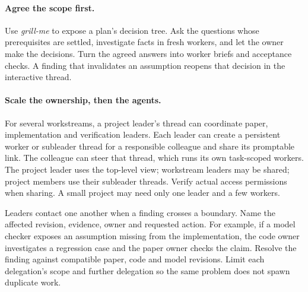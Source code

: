 \paragraph{Agree the scope first.} Use \emph{grill-me} to expose a plan's decision tree. Ask the questions whose prerequisites are settled, investigate facts in fresh workers, and let the owner make the decisions. Turn the agreed answers into worker briefs and acceptance checks. A finding that invalidates an assumption reopens that decision in the interactive thread.

\paragraph{Scale the ownership, then the agents.} For several workstreams, a project leader's thread can coordinate paper, implementation and verification leaders. Each leader can create a persistent worker or subleader thread for a responsible colleague and share its promptable link. The colleague can steer that thread, which runs its own task-scoped workers. The project leader uses the top-level view; workstream leaders may be shared; project members use their subleader threads. Verify actual access permissions when sharing. A small project may need only one leader and a few workers.

Leaders contact one another when a finding crosses a boundary. Name the affected revision, evidence, owner and requested action. For example, if a model checker exposes an assumption missing from the implementation, the code owner investigates a regression case and the paper owner checks the claim. Resolve the finding against compatible paper, code and model revisions. Limit each delegation's scope and further delegation so the same problem does not spawn duplicate work.

